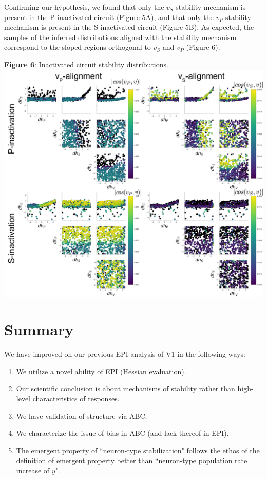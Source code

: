\documentclass[11pt]{article}
\begin{document}
Confirming our hypothesis, we found that only the $v_S$ stability mechanism is present in the P-inactivated circuit (Figure 5A), and that only the $v_P$ stability mechanism is present in the S-inactivated circuit (Figure 5B).
As expected, the samples of the inferred distributions aligned with the stability mechanism correspond to the sloped regions orthogonal to $v_S$ and $v_P$ (Figure 6).

\clearpage

\begin{center}
\textbf{Figure 6}: Inactivated circuit stability distributions.
\includegraphics[scale=.4]{figs/EPI_inactivation.pdf}
\end{center}

\section{Summary}
We have improved on our previous EPI analysis of V1 in the following ways:
\begin{enumerate}
\item We utilize a novel ability of EPI (Hessian evaluation).
\item Our scientific conclusion is about mechanisms of stability rather than high-level characteristics of responses.
\item We have validation of structure via ABC.
\item We characterize the issue of bias in ABC (and lack thereof in EPI).
\item The emergent property of ``neuron-type stabilization" follows the ethos of the definition of emergent property better than ``neuron-type population rate increase of $y$".
\end{enumerate}
\end{document}

